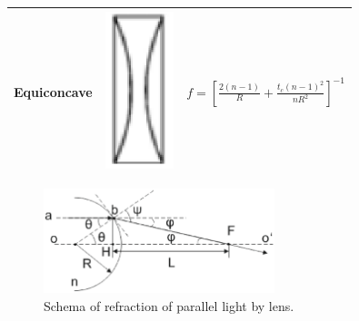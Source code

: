 \begin{table}[!ht]
\begin{tabular}{|c|c|c|}
\hline
Equiconcave & \parbox[c]{2.1cm}{\includegraphics[width=2cm]{bilder/equi_concave}} & $f=\left[\frac{2(n-1)}{R} + \frac{t_{c}(n-1)^2}{nR^2}\right]^{-1}$ \\
\hline
\end{tabular}
\label{tab:lenses_focal_length}
\end{table}
\begin{figure}[!ht]
\centering
\includegraphics[width=0.6\textwidth]{bilder/focal_length}
\caption{Schema of refraction of parallel light by lens.}
\label{fig:focal_length}
\end{figure}

